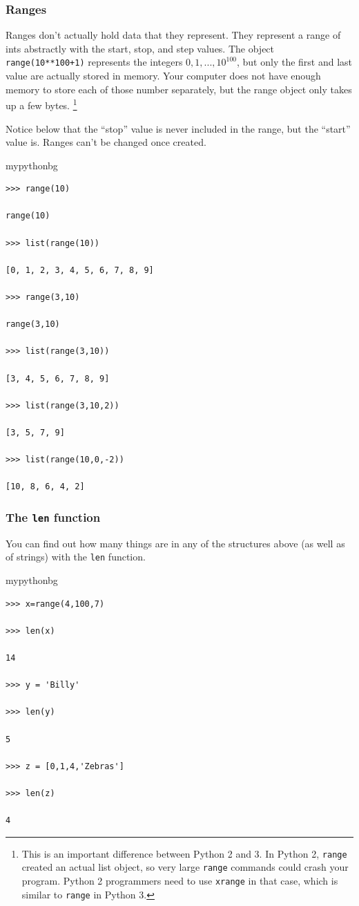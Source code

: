\subsubsection{Ranges}

Ranges don't actually hold data that they represent.
They represent a range of ints abstractly with the start, stop, and step values.
The object \texttt{range(10**100+1)} represents the integers $0,1,...,10^{100}$,
but only the first and last value are actually stored in memory.
Your computer does not have enough memory to store each of those number separately,
but the range object only takes up a few bytes.
\footnote{
This is an important difference between Python 2 and 3.
In Python 2, \texttt{range} created an actual list object,
so very large \texttt{range} commands could crash your program.
Python 2 programmers need to use \texttt{xrange} in that case,
which is similar to \texttt{range} in Python 3.
}

Notice below that the ``stop'' value is never included in the range, but the ``start'' value is.
Ranges can't be changed once created.
\begin{tsession}{mypythonbg}
\begin{verbatim}
>>> range(10)

range(10)

>>> list(range(10))

[0, 1, 2, 3, 4, 5, 6, 7, 8, 9]

>>> range(3,10)

range(3,10)

>>> list(range(3,10))

[3, 4, 5, 6, 7, 8, 9]

>>> list(range(3,10,2))

[3, 5, 7, 9]

>>> list(range(10,0,-2))

[10, 8, 6, 4, 2]
\end{verbatim}
\end{tsession}

\subsubsection{The \texttt{len} function}
You can find out how many things are in any of the structures above (as well as of strings)
with the \texttt{len} function.
\begin{tsession}{mypythonbg}
\begin{verbatim}
>>> x=range(4,100,7)

>>> len(x)

14

>>> y = 'Billy'

>>> len(y)

5

>>> z = [0,1,4,'Zebras']

>>> len(z)

4
\end{verbatim}
\end{tsession}

